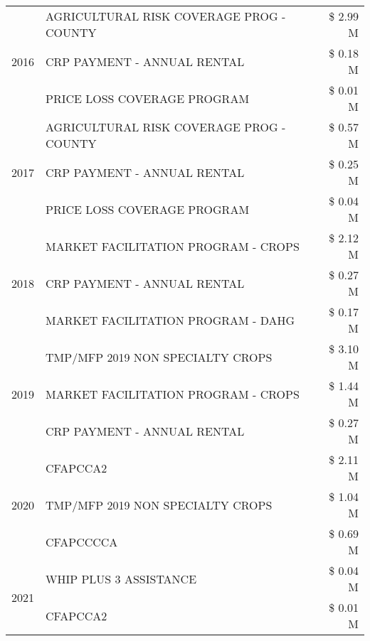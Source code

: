 \begin{tabular}{llr}
\cline{1-3}
\multirow[t]{3}{*}{2016} & AGRICULTURAL RISK COVERAGE PROG - COUNTY      & \$ 2.99 M \\
 & CRP PAYMENT - ANNUAL RENTAL                   & \$ 0.18 M \\
 & PRICE LOSS COVERAGE PROGRAM                   & \$ 0.01 M \\
\cline{1-3}
\multirow[t]{3}{*}{2017} & AGRICULTURAL RISK COVERAGE PROG - COUNTY & \$ 0.57 M \\
 & CRP PAYMENT - ANNUAL RENTAL & \$ 0.25 M \\
 & PRICE LOSS COVERAGE PROGRAM & \$ 0.04 M \\
\cline{1-3}
\multirow[t]{3}{*}{2018} & MARKET FACILITATION PROGRAM - CROPS & \$ 2.12 M \\
 & CRP PAYMENT - ANNUAL RENTAL & \$ 0.27 M \\
 & MARKET FACILITATION PROGRAM - DAHG & \$ 0.17 M \\
\cline{1-3}
\multirow[t]{3}{*}{2019} & TMP/MFP 2019 NON SPECIALTY CROPS & \$ 3.10 M \\
 & MARKET FACILITATION PROGRAM - CROPS & \$ 1.44 M \\
 & CRP PAYMENT - ANNUAL RENTAL & \$ 0.27 M \\
\cline{1-3}
\multirow[t]{3}{*}{2020} & CFAPCCA2 & \$ 2.11 M \\
 & TMP/MFP 2019 NON SPECIALTY CROPS & \$ 1.04 M \\
 & CFAPCCCCA & \$ 0.69 M \\
\cline{1-3}
\multirow[t]{2}{*}{2021} & WHIP PLUS 3 ASSISTANCE & \$ 0.04 M \\
 & CFAPCCA2 & \$ 0.01 M \\
\cline{1-3}
\bottomrule
\end{tabular}
